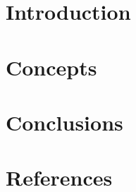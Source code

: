 \section[Intro]{Introduction}


\section[Concepts]{Concepts}


\section[Conclusions]{Conclusions}


\section[Refs]{References}
